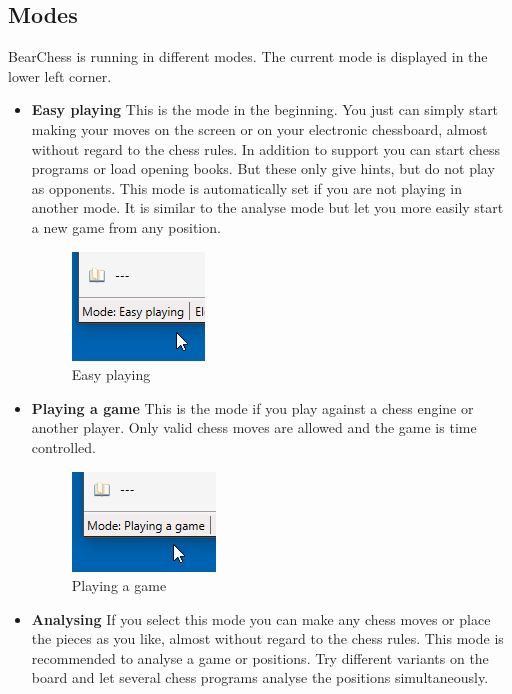 \documentclass[11pt,a4paper]{article}
\begin{document}
	\subsection{Modes}
	BearChess is running in different modes. The current mode is displayed in the lower left corner.
	\begin{itemize}
		
		\item \textbf{Easy playing} This is the mode in the beginning. You just can simply start making your moves on the screen or on your electronic chessboard, almost without regard to the chess rules. In addition to support you can start chess programs or load opening books. But these only give hints, but do not play as opponents. This mode is automatically set if you are not playing in another mode. It is similar to the analyse mode but let you more easily start a new game from any position.
		\begin{figure}[H]
			\centering
			\includegraphics[scale=1.0]{ModeEasyPlaying.png}
			\caption{Easy playing}
			\label{fig:ModeEasyPlaying}
		\end{figure}
		\item \textbf{Playing a game} This is the mode if you play against a chess engine or another player. Only valid chess moves are allowed and the game is time controlled.
		\begin{figure}[H]
			\centering
			\includegraphics[scale=1.0]{ModePlayingAGame.png}
			\caption{Playing a game}
			\label{fig:ModePlayingAGame}
		\end{figure}
		\item \textbf{Analysing} If you select this mode you can make any chess moves or place the pieces as you like, almost without regard to the chess rules. This mode is recommended to analyse a game or positions. Try different variants on the board and let several chess programs analyse the positions simultaneously. 
		\begin{figure}[H]

\end{figure}
\end{itemize}
\end{document}
